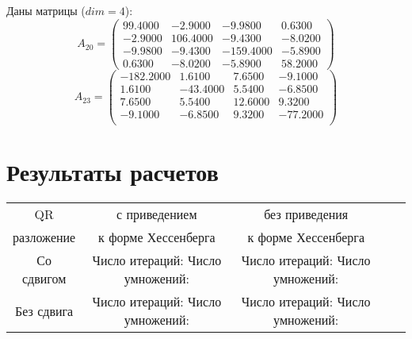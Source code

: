 \documentclass[12pt, a4paper]{article}
\begin{document}
    Даны матрицы ($dim = 4$):
    \[
        A_{20} = 
        \begin{pmatrix}
            99.4000  &   -2.9000  &   -9.9800   &   0.6300  \\  
            -2.9000  &  106.4000  &   -9.4300   &  -8.0200  \\  
            -9.9800  &   -9.4300  & -159.4000   &  -5.8900  \\  
             0.6300  &   -8.0200  &   -5.8900   &  58.2000  
        \end{pmatrix}
    \]
    \[
        A_{23} = 
        \begin{pmatrix}
            -182.2000  &    1.6100   &   7.6500  &   -9.1000  \\
               1.6100  &  -43.4000   &   5.5400  &   -6.8500  \\
               7.6500  &    5.5400   &  12.6000  &    9.3200  \\
              -9.1000  &   -6.8500   &   9.3200  &  -77.2000  \\
        \end{pmatrix}
    \]
    \newpage

    \section{Результаты расчетов}

\noindent\begin{center}%
\begin{tabular}{|c|c|c|c|c|}
\hline
QR&с приведением& без приведения\\

разложение&к форме Хессенберга& к форме Хессенберга\\
\hline
Со сдвигом&Число итераций:  Число умножений:& Число итераций:  Число умножений: \\
\hline
Без сдвига&Число итераций:  Число умножений:& Число итераций:  Число умножений: \\
\hline

\end{tabular}
\end{center}
\end{document}
